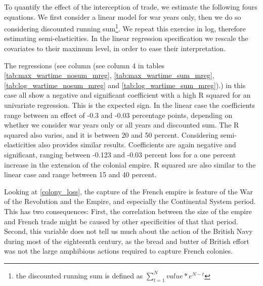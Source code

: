 \documentclass[12pt,a4paper,notitlepage,english]{article}
\begin{document}

To quantify the effect of the interception of trade, we estimate the following fours equations.
We first consider a linear model for war years only, then we do so considering discounted running sum\footnote{the discounted running sum is defined as $\sum_{t=1}^N value*e^{N-t}$}. We repeat this exercise in log, therefore estimating semi-elasticities. 
In the linear regression specification we rescale the covariates to their maximum level, in order to ease their interpretation. 



The regressions (see column (see column 4 in tables \ref{tab:max_wartime_nosum_mreg},  \ref{tab:max_wartime_sum_mreg}, \ref{tab:log_wartime_nosum_mreg} and   \ref{tab:log_wartime_sum_mreg}).) in this case all show a negative and significant coefficient with a high R squared for an univariate regression.
This is the expected sign.
In the linear case the coefficients range between an effect of -0.3 and -0.03 percentage points, depending on whether we consider war years only or all years and discounted sum.
The R squared also varies, and it is between 20 and 50 percent.
Considering semi-elasticities also provides similar results.
Coefficients are again negative and significant, ranging between -0.123 and -0.03 percent loss for a one percent increase in the extension of the colonial empire.
R squared are also similar to the linear case and range between 15 and 40 percent.

Looking at \ref{colony_loss}, the capture of the French empire is feature of the War of the Revolution and the Empire, and especially the Continental System period.
This has two consequences:
First, the correlation between the size of the empire and French trade might be caused by other specificities of that that period.
Second, this variable does not tell us much about the action of the British Navy during most of the eighteenth century, as the bread and butter of British effort was not the large amphibious actions required to capture French colonies.
\end{document}
